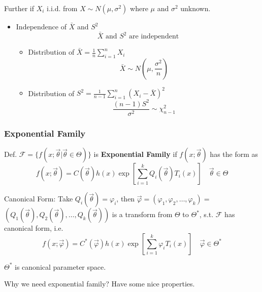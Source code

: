    Further if $X_i$ i.i.d. from $X\sim N(\mu,\sigma^2)$ where $\mu$ and $\sigma^2$ unknown.
    \begin{itemize}
        \item Independence of $\bar{X}$ and $S^2$ 
            \[\bar{X}\text{ and }S^2 \text{ are independent}\]
        \begin{itemize}[topsep=6pt,itemsep=4pt]
        \item Distribution of $\bar{X}={\displaystyle\frac{1}{n}\sum_{i=1}^n X_i}$
        \[\bar{X}\sim N(\mu,\frac{\sigma^2}{n})\]
        \item Distribution of $S^2={\displaystyle\frac{1}{n-1}\sum_{i=1}^n(X_i-\bar{X})^2}$
        \[\frac{(n-1)S^2}{\sigma^2}\sim\chi^2_{n-1}\]
        \end{itemize}        
    \end{itemize}

    \subsubsection{Exponential Family}\label{SubSectionExponentialFamily}
        Def. $\mathscr{F}=\{f(x;\vec{\theta}|\vec{\theta}\in\Theta)\}$ is \textbf{Exponential Family} if $f(x;\vec{\theta})$ has the form as
\[
    f(x;\vec{\theta})=C(\vec{\theta})h(x)\exp \left[  \sum_{i=1}^k Q_i(\vec{\theta})T_i(x) \right]\quad\vec{\theta}\in\Theta
\]    

    Canonical Form: Take $Q_i(\vec{\theta})=\varphi_i$, then $\vec{\varphi}=(\varphi_1,\varphi_2,\ldots,\varphi_k)=$$(Q_1(\vec{\theta}),Q_2(\vec{\theta}),\ldots,Q_k(\vec{\theta}))$ is a transform from $\Theta$ to $\Theta^*$, s.t. $\mathscr{F}$ has canonical form, i.e.
    \[
        f(x;\vec{\varphi})=C^*(\vec{\varphi})h(x)   \exp\left[  \sum_{i=1}^k \varphi_i T_i(x) \right] \quad \vec{\varphi}\in\Theta^*
    \]

    $\Theta^*$ is canonical parameter space.

\begin{point}
    Why we need exponential family? Have some nice properties.
\end{point}




